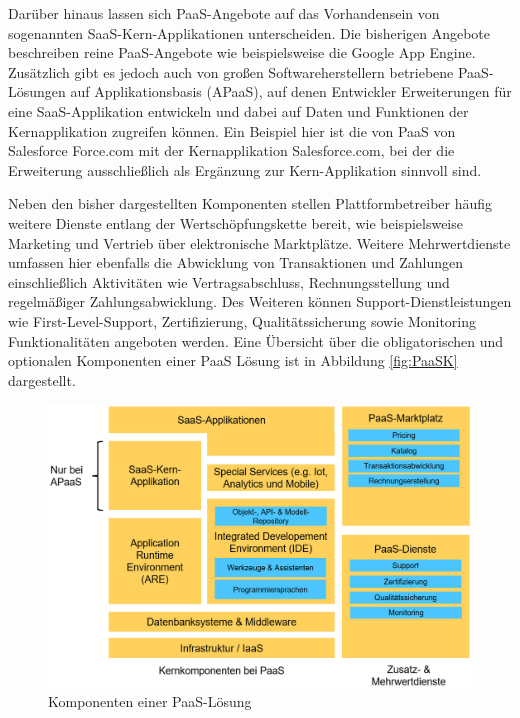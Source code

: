 Darüber hinaus lassen sich PaaS-Angebote auf das Vorhandensein von sogenannten SaaS-Kern-Applikationen unterscheiden. Die bisherigen Angebote beschreiben reine PaaS-Angebote wie beispielsweise die Google App Engine. Zusätzlich gibt es jedoch auch von großen Softwareherstellern betriebene PaaS-Lösungen auf Applikationsbasis (APaaS), auf denen Entwickler Erweiterungen für eine SaaS-Applikation entwickeln und dabei auf Daten und Funktionen der Kernapplikation zugreifen können. Ein Beispiel hier ist die von PaaS von Salesforce Force.com mit der Kernapplikation Salesforce.com, bei der die Erweiterung ausschließlich als Ergänzung zur Kern-Applikation sinnvoll sind. \autocite[Vgl.][S. 371]{BEIMBORN2011} 

Neben den bisher dargestellten Komponenten stellen Plattformbetreiber häufig weitere Dienste entlang der Wertschöpfungskette bereit, wie beispielsweise Marketing und Vertrieb über elektronische Marktplätze. Weitere Mehrwertdienste umfassen hier ebenfalls die Abwicklung von Transaktionen und Zahlungen einschließlich Aktivitäten wie Vertragsabschluss, Rechnungsstellung und regelmäßiger Zahlungsabwicklung. Des Weiteren können Support-Dienstleistungen wie First-Level-Support, Zertifizierung, Qualitätssicherung sowie Monitoring Funktionalitäten angeboten werden. \autocite[Vgl.][S. 598]{HAHN2016} Eine Übersicht über die obligatorischen und optionalen Komponenten einer PaaS Lösung ist in Abbildung \vref{fig:PaaSK} dargestellt.


\begin{figure}[h]
    \centering
    \includegraphics[width=1\textwidth]{img/PaaS_Komponenten.jpg}
    \caption[Komponenten einer PaaS-Lösung]{Komponenten einer PaaS-Lösung\autocite{PaaSK}}
    \label{fig:PaaSK}
\end{figure}

